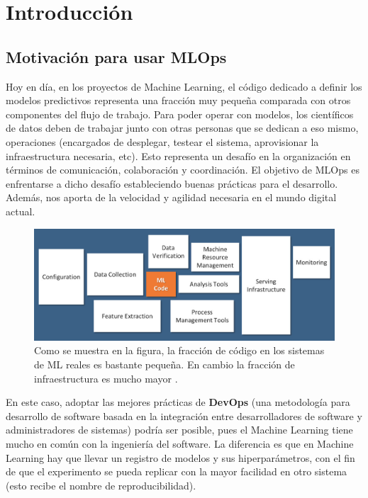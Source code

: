 \chapter{Introducción}

\section{Motivación para usar MLOps}

Hoy en día, en los proyectos de Machine Learning, el código dedicado a definir los modelos predictivos representa una fracción muy pequeña comparada con otros componentes del flujo de trabajo. Para poder operar con modelos, los científicos de datos deben de trabajar junto con otras personas que se dedican a eso mismo, operaciones (encargados de desplegar, testear el sistema, aprovisionar la infraestructura necesaria, etc). Esto representa un desafío en la organización en términos de comunicación, colaboración y coordinación. El objetivo de MLOps es enfrentarse a dicho desafío estableciendo buenas prácticas para el desarrollo. Además, nos aporta de la velocidad y agilidad necesaria en el mundo digital actual.

\begin{figure}[h]
	\includegraphics[scale=1]{imagenes/01_Introduccion/mlcodefraction.jpg}
	\centering
	\caption{Como se muestra en la figura, la fracción de código en los sistemas de ML reales es bastante pequeña. En cambio la fracción de infraestructura es mucho mayor \cite{bank2020autoencoders}.}
\end{figure}

En este caso, adoptar las mejores prácticas de \textbf{DevOps} (una metodología para desarrollo de software basada en la integración entre desarrolladores de software y administradores de sistemas) podría ser posible, pues el Machine Learning tiene mucho en común con la ingeniería del software. La diferencia es que en Machine Learning hay que llevar un registro de modelos y sus hiperparámetros, con el fin de que el experimento se pueda replicar con la mayor facilidad en otro sistema (esto recibe el nombre de reproducibilidad).\newline

